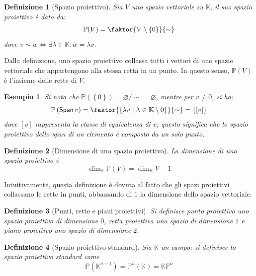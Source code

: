 \documentclass[11pt, a4paper]{scrartcl}
\theoremstyle{style1}
\newtheorem{definizione}{Definizione}[section]
\newtheorem{esempio}{Esempio}[section]
\numberwithin{equation}{subsection}
\renewcommand{\operatorname}[1]{\mathop{\mathrm{\textsf{#1}}}}
\begin{document}
\begin{definizione}
	[Spazio proiettivo]
	Sia $V$ uno spazio vettoriale su $\mathbb{K}$; il suo \textit{spazio proiettivo} \`e dato da:
	\[
		\mathbb{P}( V) = \faktor{V \setminus \left\{ 0 \right\} }{\sim}
	\] 
	dove $v\sim w \iff \exists \lambda \in \mathbb{K} : w = \lambda v$.
\end{definizione}
\noindent Dalla definizione, uno spazio proiettivo collassa tutti i vettori di uno spazio vettoriale che appartengono alla stessa retta in un punto.
In questo senso, $\mathbb{P} (V)$ \`e l'insieme delle rette di $V$.
\begin{esempio}
Si nota che $\mathbb{P} \left(\left\{ 0 \right\} \right) = \varnothing / {\sim} = \varnothing$, mentre per $v\neq 0$, si ha:
\[
	\mathbb{P}\left(\operatorname{Span} v\right) = \faktor{\left\{ \lambda v  \mid \lambda \in \mathbb{K}\setminus 0 \right\} }{\sim} = \left\{ \left[ v \right]  \right\} 
\] 
dove $\left[ v \right] $ rappresenta la classe di equivalenza di $v$; questo significa che lo spazio proiettivo dello span di un elemento \`e composto da un solo punto.
\end{esempio}
\begin{definizione}
	[Dimensione di uno spazio proiettivo]
	La dimensione di uno spazio proiettivo \`e
	\[
	\dim_{\mathbb{K}} \mathbb{P}(V) = \dim_{\mathbb{K}} V - 1
	\] 
\end{definizione}
\noindent Intuitivamente, questa definizione \`e dovuta al fatto che gli spazi proiettivi collassano le rette in punti, abbassando di $1$ la dimensione dello spazio vettoriale.

\begin{definizione}
	[Punti, rette e piani proiettivi]
	Si definisce \textit{punto proiettivo} uno spazio proiettivo di dimensione $0$, \textit{retta proiettiva} uno spazio di dimensione $1$ e \textit{piano proiettivo} uno spazio di dimensione $2$.
\end{definizione}
\begin{definizione}
	[Spazio proiettivo standard]
	Sia $\mathbb{K}$ un campo; si definisce lo \textit{spazio proiettivo standard} come
	\[
	\mathbb{P}(\mathbb{K}^{n+1} ) = \mathbb{P}^n(\mathbb{K}) = \mathbb{K}\mathbb{P}^n
	\] 
\end{definizione}
\end{document}
